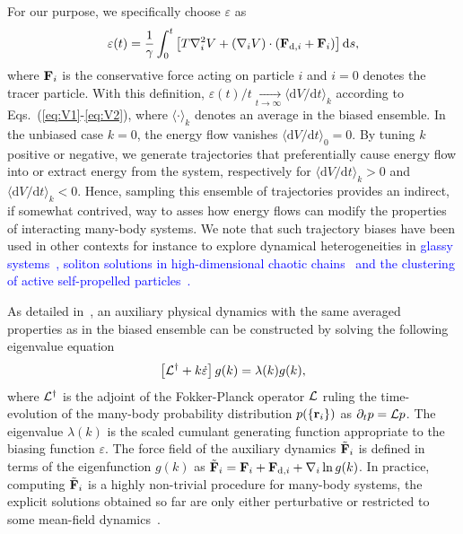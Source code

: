 \documentclass[pre, superscriptaddress, twocolumn,pre]{revtex4-1}
\newcommand{\dd}{\text{d}}
\begin{document}
For our purpose, we specifically choose $\varepsilon$ as
\begin{equation}\label{eq:eps}
	\varepsilon(t) = \frac{1}{\gamma} \int_0^t \left[ T\nabla_i^2 V + (\nabla_i V)\cdot({\bf F}_{{\rm d},i}+{\bf F}_i) \right] \dd s ,
\end{equation}
where ${\bf F}_i$ is the conservative force acting on particle $i$ and $i=0$ denotes the tracer particle. With this definition, $\varepsilon(t)/t \underset{t\to\infty}{\longrightarrow} \langle\dd V/\dd t\rangle_k$ according to Eqs.~(\ref{eq:V1}-\ref{eq:V2}), where $\langle\cdot\rangle_k$ denotes an average in the biased ensemble. In the unbiased case $k=0$, the energy flow vanishes $\langle\dd V/\dd t\rangle_0 = 0$. By tuning $k$ positive or negative, we generate trajectories that preferentially cause energy flow into or extract energy from the system, respectively for $\langle\dd V/\dd t\rangle_k>0$ and $\langle\dd V/\dd t\rangle_k<0$. Hence, sampling this ensemble of trajectories provides an indirect, if somewhat contrived, way to asses how energy flows can modify the properties of interacting many-body systems. We note that such trajectory biases have been used in other contexts for instance to explore dynamical heterogeneities in \textcolor{blue}{glassy systems~\cite{garrahan2007,Hedges2009,Pitard2011,Speck2012,Bodineau2012a,Limmer2014,Nemoto2017}, soliton solutions in high-dimensional chaotic chains~\cite{tailleur2007probing,laffargue2013} and the clustering of active self-propelled particles~\cite{Cagnetta2017,Whitelam2018,nemoto2018optimizing}.} 





As detailed in~\cite{Chetrite2013}, an auxiliary physical dynamics with the same averaged properties as in the biased ensemble can be constructed by solving the following eigenvalue equation 
\begin{equation}\label{eq:adjointbiased}
	\left[{\cal L}^\dagger + k \dot\varepsilon\right] g(k) = \lambda(k) g(k) ,
\end{equation}
where ${\cal L}^\dagger$ is the adjoint of the Fokker-Planck operator $\cal L$ ruling the time-evolution of the many-body probability distribution $p(\{{\bf r}_i\})$ as $\partial_t p = {\cal L} p$. The eigenvalue $\lambda(k)$ is the scaled cumulant generating function appropriate to the biasing function $\varepsilon$. The force field of the auxiliary dynamics $\tilde{\bf F}_i$ is defined in terms of the eigenfunction $g(k)$ as $\tilde {\bf F}_i = {\bf F}_i+ {\bf F}_{{\rm d},i} + \nabla_i \ln g(k)$. In practice, computing $\tilde {\bf F}_i$ is a highly non-trivial procedure for many-body systems, the explicit solutions obtained so far are only either perturbative or restricted to some mean-field dynamics~\cite{Nemoto2018a}.
\end{document}
